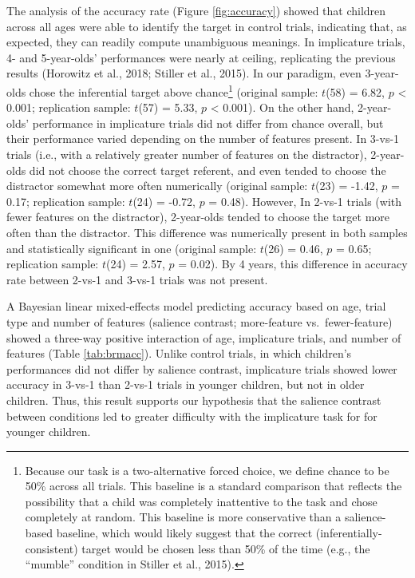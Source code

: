 \documentclass[man]{apa6}
\theoremstyle{definition}
\theoremstyle{definition}
\theoremstyle{definition}
\theoremstyle{remark}
\begin{document}
The analysis of the accuracy rate (Figure \ref{fig:accuracy}) showed
that children across all ages were able to identify the target in
control trials, indicating that, as expected, they can readily compute
unambiguous meanings. In implicature trials, 4- and 5-year-olds'
performances were nearly at ceiling, replicating the previous results
(Horowitz et al., 2018; Stiller et al., 2015). In our paradigm, even
3-year-olds chose the inferential target above chance\footnote{Because
  our task is a two-alternative forced choice, we define chance to be
  50\% across all trials. This baseline is a standard comparison that
  reflects the possibility that a child was completely inattentive to
  the task and chose completely at random. This baseline is more
  conservative than a salience-based baseline, which would likely
  suggest that the correct (inferentially-consistent) target would be
  chosen less than 50\% of the time (e.g., the \enquote{mumble}
  condition in Stiller et al., 2015).} (original sample: \(t\)(58) =
6.82, \(p\) \textless{} 0.001; replication sample: \(t\)(57) = 5.33,
\(p\) \textless{} 0.001). On the other hand, 2-year-olds' performance in
implicature trials did not differ from chance overall, but their
performance varied depending on the number of features present. In
3-vs-1 trials (i.e., with a relatively greater number of features on the
distractor), 2-year-olds did not choose the correct target referent, and
even tended to choose the distractor somewhat more often numerically
(original sample: \(t\)(23) = -1.42, \(p\) = 0.17; replication sample:
\(t\)(24) = -0.72, \(p\) = 0.48). However, In 2-vs-1 trials (with fewer
features on the distractor), 2-year-olds tended to choose the target
more often than the distractor. This difference was numerically present
in both samples and statistically significant in one (original sample:
\(t\)(26) = 0.46, \(p\) = 0.65; replication sample: \(t\)(24) = 2.57,
\(p\) = 0.02). By 4 years, this difference in accuracy rate between
2-vs-1 and 3-vs-1 trials was not present.

A Bayesian linear mixed-effects model predicting accuracy based on age,
trial type and number of features (salience contrast; more-feature
vs.~fewer-feature) showed a three-way positive interaction of age,
implicature trials, and number of features (Table \ref{tab:brmacc}).
Unlike control trials, in which children's performances did not differ
by salience contrast, implicature trials showed lower accuracy in 3-vs-1
than 2-vs-1 trials in younger children, but not in older children. Thus,
this result supports our hypothesis that the salience contrast between
conditions led to greater difficulty with the implicature task for for
younger children.
\end{document}
